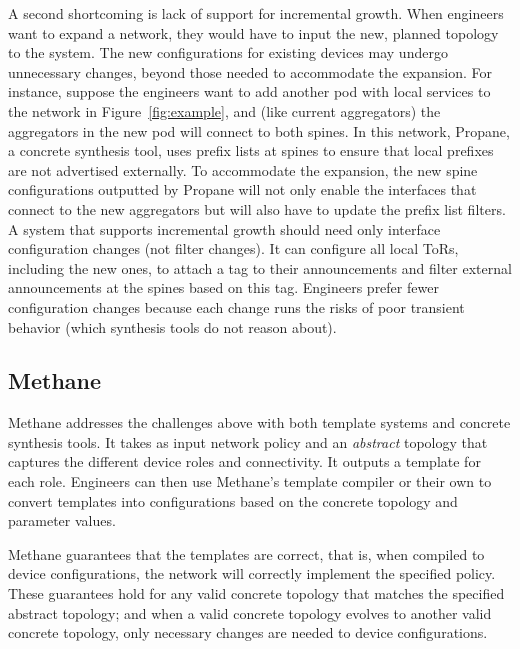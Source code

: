\documentclass{sig-alternate-10pt}
\newcommand{\sysname}{{\small \sf Methane}\xspace}
\newcommand{\sysnamesec}{{\sf Methane}\xspace}
\begin{document}
A second shortcoming is lack of support for incremental growth. When engineers want to expand a network, they would have to input the new, planned topology to the system. The new configurations for existing devices may undergo unnecessary changes, beyond those needed to accommodate the expansion. For instance, suppose the engineers want to add another pod with local services to the network in Figure~\ref{fig:example}, and (like current aggregators) the aggregators in the new pod will connect to both spines. In this network, Propane, a concrete synthesis tool, uses prefix lists at spines to ensure that local prefixes are not advertised externally. To accommodate the expansion, the new spine configurations outputted by Propane will not only enable the interfaces that connect to the new aggregators but will also have to update the prefix list filters. A system that supports incremental growth should need only interface configuration changes (not filter changes). It can configure all local ToRs, including the new ones, to attach a tag to their announcements and filter external announcements at the spines based on this tag. Engineers prefer fewer configuration changes because each change runs the risks of poor transient behavior (which synthesis tools do not reason about).

\subsection{\sysnamesec} 

\sysname addresses the challenges above with both template systems and concrete synthesis tools. It takes as input network policy and an {\em abstract} topology  that captures the different device roles and connectivity. It outputs a template for each role. Engineers can then use \sysname's template compiler or their own to convert templates into configurations based on the concrete topology and parameter values. 

\sysname guarantees that the templates are correct, that is, when compiled to device configurations, the network will correctly implement the specified policy. These guarantees hold for any valid concrete topology that matches the specified abstract topology; and when a valid concrete topology evolves to another valid concrete topology, only necessary changes are needed to device configurations.


%
%
%
%
\end{document}
